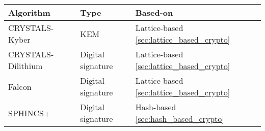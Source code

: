 \begin{tabular}{|l|l|l|}
  \hline
  Algorithm          & Type              & Based-on                                     \\
  \hline
  CRYSTALS-Kyber     & KEM               & Lattice-based \ref{sec:lattice_based_crypto} \\
  CRYSTALS-Dilithium & Digital signature & Lattice-based \ref{sec:lattice_based_crypto} \\
  Falcon             & Digital signature & Lattice-based \ref{sec:lattice_based_crypto} \\
  SPHINCS+           & Digital signature & Hash-based \ref{sec:hash_based_crypto}       \\
  \hline
\end{tabular}